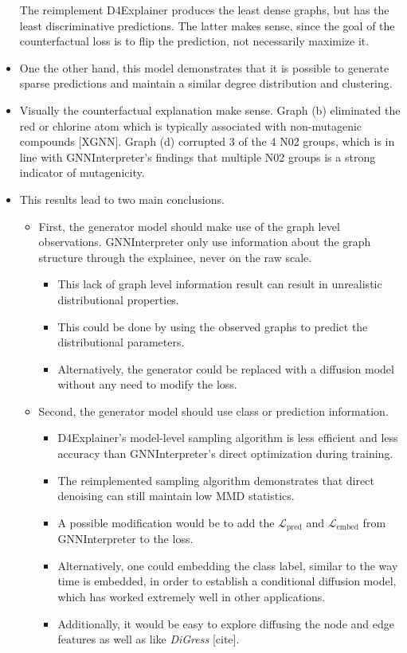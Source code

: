 \documentclass[
  11pt,
  letterpaper,
]{article}
\begin{document}
\begin{itemize}
  The reimplement D4Explainer produces the least dense graphs, but has
  the least discriminative predictions. The latter makes sense, since
  the goal of the counterfactual loss is to flip the prediction, not
  necessarily maximize it.
\item
  One the other hand, this model demonstrates that it is possible to
  generate sparse predictions and maintain a similar degree distribution
  and clustering.
\item
  Visually the counterfactual explanation make sense. Graph (b)
  eliminated the red or chlorine atom which is typically associated with
  non-mutagenic compounds {[}XGNN{]}. Graph (d) corrupted 3 of the 4 N02
  groups, which is in line with GNNInterpreter's findings that multiple
  N02 groups is a strong indicator of mutagenicity.
\item
  This results lead to two main conclusions.

  \begin{itemize}
  \item
    First, the generator model should make use of the graph level
    observations. GNNInterpreter only use information about the graph
    structure through the explainee, never on the raw scale.

    \begin{itemize}
    \item
      This lack of graph level information result can result in
      unrealistic distributional properties.
    \item
      This could be done by using the observed graphs to predict the
      distributional parameters.
    \item
      Alternatively, the generator could be replaced with a diffusion
      model without any need to modify the loss.
    \end{itemize}
  \item
    Second, the generator model should use class or prediction
    information.

    \begin{itemize}
    \item
      D4Explainer's model-level sampling algorithm is less efficient and
      less accuracy than GNNInterpreter's direct optimization during
      training.
    \item
      The reimplemented sampling algorithm demonstrates that direct
      denoising can still maintain low MMD statistics.
    \item
      A possible modification would be to add the
      \(\mathcal{L}_\text{pred}\) and \(\mathcal{L}_\text{embed}\) from
      GNNInterpreter to the loss.
    \item
      Alternatively, one could embedding the class label, similar to the
      way time is embedded, in order to establish a conditional
      diffusion model, which has worked extremely well in other
      applications.
    \item
      Additionally, it would be easy to explore diffusing the node and
      edge features as well as like \emph{DiGress} {[}cite{]}.
    \end{itemize}
  \end{itemize}
\end{itemize}
\end{document}
